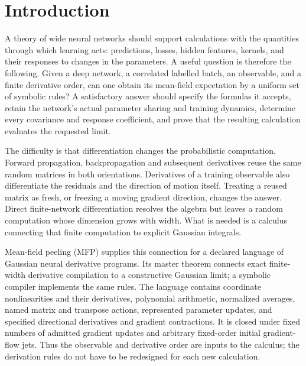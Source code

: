 \section{Introduction}

A theory of wide neural networks should support calculations with the
quantities through which learning acts: predictions, losses, hidden features,
kernels, and their responses to changes in the parameters. A useful question
is therefore the following. Given a deep network, a correlated labelled batch,
an observable, and a finite derivative order, can one obtain its mean-field
expectation by a uniform set of symbolic rules? A satisfactory answer should
specify the formulas it accepts, retain the network's actual parameter sharing
and training dynamics, determine every covariance and response coefficient,
and prove that the resulting calculation evaluates the requested limit.

The difficulty is that differentiation changes the probabilistic computation.
Forward propagation, backpropagation and subsequent derivatives reuse the same
random matrices in both orientations. Derivatives of a training observable also
differentiate the residuals and the direction of motion itself. Treating a
reused matrix as fresh, or freezing a moving gradient direction, changes the
answer. Direct finite-network differentiation resolves the algebra but leaves
a random computation whose dimension grows with width. What is needed is a
calculus connecting that finite computation to explicit Gaussian integrals.

Mean-field peeling (MFP) supplies this connection for a declared language of
Gaussian neural derivative programs. Its master theorem connects exact
finite-width derivative compilation to a constructive Gaussian limit;
a symbolic compiler implements the same rules. The language contains coordinate
nonlinearities and their derivatives, polynomial arithmetic, normalized
averages, named matrix and transpose actions, represented parameter updates,
and specified directional derivatives and gradient contractions. It is closed
under fixed numbers of admitted gradient updates and arbitrary fixed-order
initial gradient-flow jets. Thus the observable and derivative order are
inputs to the calculus; the derivation rules do not have to be redesigned for
each new calculation.

